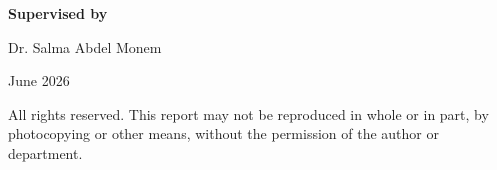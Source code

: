\documentclass[12pt,a4paper,oneside]{report}
\begin{document}
\begin{titlepage}
\begin{center}
{\bfseries\fontsize{16}{18}\selectfont Supervised by}

\vspace{0.25cm}

{\fontsize{14}{16}\selectfont Dr. Salma Abdel Monem}

\vspace{0.45cm}

{\fontsize{12}{14}\selectfont June 2026}

\vfill

{\fontsize{11}{14}\selectfont
All rights reserved. This report may not be reproduced in whole or in part,
by photocopying or other means, without the permission of the author or department.
}

\end{center}
\end{titlepage}

\setcounter{page}{2}
\end{document}
